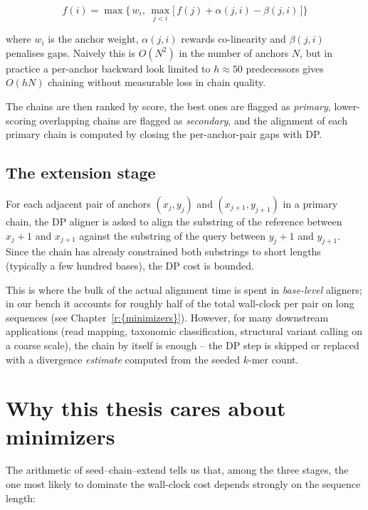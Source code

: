\begin{equation*}
f(i) = \max\Big\{\, w_i,\, \max_{j < i}\big[\, f(j) + \alpha(j, i) - \beta(j, i)\,\big] \Big\}
\end{equation*}

where $w_i$ is the anchor weight, $\alpha(j, i)$ rewards co-linearity
and $\beta(j, i)$ penalises gaps. Naively this is $O(N^2)$ in the
number of anchors $N$, but in practice a per-anchor backward look
limited to $h \approx 50$ predecessors gives $O(hN)$ chaining
without measurable loss in chain quality.

The chains are then ranked by score, the best ones are flagged as
\emph{primary}, lower-scoring overlapping chains are flagged as
\emph{secondary}, and the alignment of each primary chain is computed
by closing the per-anchor-pair gaps with DP.

\subsection{The extension stage}

For each adjacent pair of anchors $(x_j, y_j)$ and $(x_{j+1},
y_{j+1})$ in a primary chain, the DP aligner is asked to align the
substring of the reference between $x_j + 1$ and $x_{j+1}$ against
the substring of the query between $y_j + 1$ and $y_{j+1}$. Since the
chain has already constrained both substrings to short lengths
(typically a few hundred bases), the DP cost is bounded.

This is where the bulk of the actual alignment time is spent in
\emph{base-level} aligners; in our bench it accounts for roughly half
of the total wall-clock per pair on long sequences (see
Chapter~\ref{r:{minimizers}}). However, for many downstream
applications (read mapping, taxonomic classification, structural
variant calling on a coarse scale), the chain by itself is enough --
the DP step is skipped or replaced with a divergence
\emph{estimate} computed from the seeded $k$-mer count.

\section{Why this thesis cares about minimizers}

The arithmetic of seed--chain--extend tells us that, among the three
stages, the one most likely to dominate the wall-clock cost depends
strongly on the sequence length:

